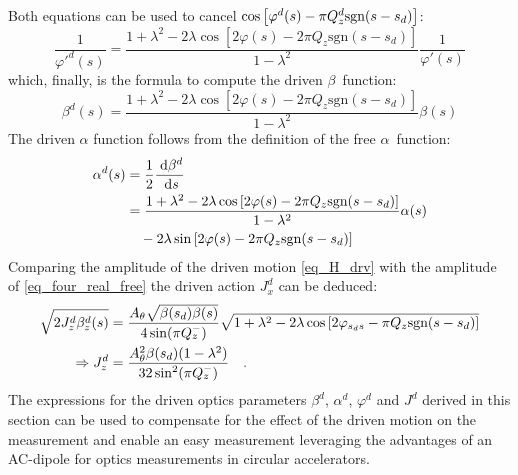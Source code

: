 %
Both equations can be used to cancel $\cos\left[ \varphi^d(s) - \pi Q^{d}_{z}\text{sgn}(s-s_d) \right]$:
%
\begin{equation}
  \frac{1}{\varphi'^d(s)} = 
  \frac{1+\lambda^2-2\lambda\cos\left[ 2\varphi(s) - 2\pi Q_z\text{sgn}(s-s_d)\right]}{1-\lambda^2}
  \frac{1}{\varphi'(s)}
\end{equation}
%
which, finally, is the formula to compute the driven $\beta$~function:
%
\begin{equation}
  \beta^d(s) =
  \frac{1+\lambda^2-2\lambda\cos\left[ 2\varphi(s) - 2\pi Q_z\text{sgn}(s-s_d)\right]}{1-\lambda^2}
  \beta(s)
\end{equation}
%
The driven $\alpha$ function follows from the definition of the free $\alpha$~function:
\begin{align}
  \alpha^d(s) &=  \frac{1}{2}\frac{\;\text{d} \beta^d}{\;\text{d} s}\notag \\
  &= 
  \frac{1+\lambda^2-2\lambda\cos\left[ 2\varphi(s) - 2\pi Q_z\text{sgn}(s-s_d)\right]}{1-\lambda^2}
  \alpha(s) \notag \\
  &\quad- 2\lambda \sin\left[ 2\varphi(s) - 2\pi Q_z\text{sgn}(s-s_d) \right]
  \label{eq_drv_alpha}
\end{align}
%
Comparing the amplitude of the driven motion \eqref{eq_H_drv} with the amplitude of \eqref{eq_four_real_free}
the driven action $J_x^d$ can be deduced:
%
\begin{align}
  \sqrt{2J_z^d\beta_z^d(s)} &= 
  \frac{A_\theta\sqrt{\beta(s_d)\beta(s)}}{4\sin(\pi Q_z^-)}
  \sqrt{1+\lambda^2-2\lambda\cos\left[2\varphi_{s_ds} - \pi Q_z\text{sgn}(s-s_d)\right]} \notag \\
  \Rightarrow J_z^d &=  \frac{A_\theta^2\beta(s_d)(1-\lambda^2)}{32 \sin^2(\pi Q_z^-)}
  \quad .
  \label{eq_drv_Jy}
\end{align}
%
The expressions for the driven optics parameters $\beta^d$, $\alpha^d$, $\varphi^d$ and $J^d$ derived
in this section can be used to compensate for the effect of the driven motion on the measurement and enable
an easy measurement leveraging the advantages of an AC-dipole for optics measurements in circular
accelerators.

